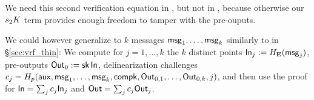 We need this second verification equation in \PedVRF, but not in \ThinVRF,
because otherwise our $s_2 K$ term provides enough freedom to tamper
with the pre-ouputs.  

We could however generalize \PedVRF to $k$ messages $\mathsf{msg}_1,\ldots,\mathsf{msg}_k$
similarly to \ThinVRF in \S\ref{sec:vrf_thin}:  We compute for
$j=1,\ldots,k$ the $k$ distinct
points ${\mathsf{In}}_j := H_{{\mathbf{E}}}(\mathsf{msg}_j)$, pre-outputs ${\mathsf{Out}}_0 := \mathsf{sk} \, {\mathsf{In}}$,
delinearization challenges
 $c_j = H_p(\mathsf{aux},\mathsf{msg}_1,\ldots,\mathsf{msg}_k,\mathsf{compk},{\mathsf{Out}}_{0,1},\ldots,{\mathsf{Out}}_{0,k},j)$,
and then use the \PedVRF proof for
 ${\mathsf{In}} = \sum_j c_j {\mathsf{In}}_j$ and ${\mathsf{Out}} = \sum_j c_j {\mathsf{Out}}_j$.



\endinput






